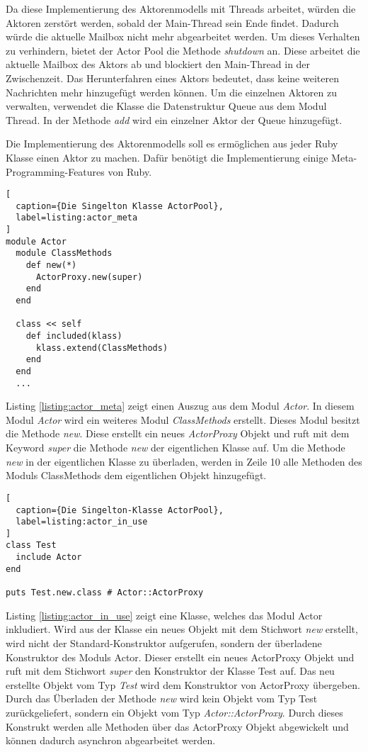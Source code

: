 Da diese Implementierung des Aktorenmodells mit Threads arbeitet, würden die Aktoren zerstört werden, sobald der Main-Thread sein Ende findet. Dadurch würde die aktuelle Mailbox nicht mehr abgearbeitet werden. Um dieses Verhalten zu verhindern, bietet der Actor Pool die Methode \emph{shutdown} an. Diese arbeitet die aktuelle Mailbox des Aktors ab und blockiert den Main-Thread in der Zwischenzeit. Das Herunterfahren eines Aktors bedeutet, dass keine weiteren Nachrichten mehr hinzugefügt werden können. Um die einzelnen Aktoren zu verwalten, verwendet die Klasse die Datenstruktur Queue aus dem Modul Thread. In der Methode \emph{add} wird ein einzelner Aktor der Queue hinzugefügt. 

Die Implementierung des Aktorenmodells soll es ermöglichen aus jeder Ruby Klasse einen Aktor zu machen. Dafür benötigt die Implementierung einige Meta-Programming-Features von Ruby. 

\begin{lstlisting}[
  caption={Die Singelton Klasse ActorPool},
  label=listing:actor_meta
]
module Actor
  module ClassMethods
    def new(*)
      ActorProxy.new(super)
    end
  end

  class << self
    def included(klass)
      klass.extend(ClassMethods)
    end
  end
  ...
\end{lstlisting}


Listing \ref{listing:actor_meta} zeigt einen Auszug aus dem Modul \emph{Actor}. In diesem Modul \emph{Actor} wird ein weiteres Modul \emph{ClassMethods} erstellt. Dieses Modul besitzt die Methode \emph{new}. Diese erstellt ein neues \emph{ActorProxy} Objekt und ruft mit dem Keyword \emph{super} die Methode \emph{new} der eigentlichen Klasse auf. Um die Methode \emph{new} in der eigentlichen Klasse zu überladen, werden in Zeile 10 alle Methoden des Moduls ClassMethods dem eigentlichen Objekt hinzugefügt. 

\begin{lstlisting}[
  caption={Die Singelton-Klasse ActorPool},
  label=listing:actor_in_use
]
class Test
  include Actor
end

puts Test.new.class # Actor::ActorProxy
\end{lstlisting}

Listing \ref{listing:actor_in_use} zeigt eine Klasse, welches das Modul Actor inkludiert.  Wird aus der Klasse ein neues Objekt mit dem Stichwort \emph{new} erstellt, wird nicht der Standard-Konstruktor aufgerufen, sondern der überladene Konstruktor des Moduls Actor. Dieser erstellt ein neues ActorProxy Objekt und ruft mit dem Stichwort \emph{super} den Konstruktor der Klasse Test auf. Das neu erstellte Objekt vom Typ \emph{Test} wird dem Konstruktor von ActorProxy übergeben. Durch das Überladen der Methode \emph{new} wird kein Objekt vom Typ Test zurückgeliefert, sondern ein Objekt vom Typ \emph{Actor::ActorProxy}. Durch dieses Konstrukt 
werden alle Methoden über das ActorProxy Objekt abgewickelt und können dadurch asynchron abgearbeitet werden.

